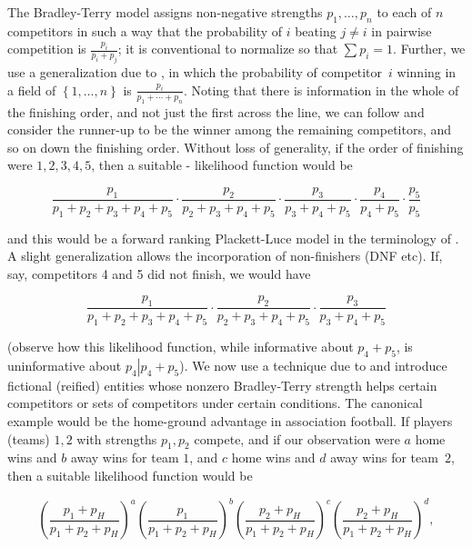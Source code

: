 \documentclass[a4,12pt]{article}
\begin{document}
The Bradley-Terry model \citep{bradley1952} assigns non-negative
strengths $p_1,\ldots, p_n$ to each of $n$ competitors in such a way
that the probability of $i$ beating $j\neq i$ in pairwise competition
is $\frac{p_i}{p_i+p_j}$; it is conventional to normalize so that
$\sum p_i=1$. Further, we use a generalization due to
\citet{luce1959}, in which the probability of competitor~$i$ winning
in a field of $\left\lbrace 1,\ldots, n\right\rbrace$ is
$\frac{p_i}{p_1+\cdots +p_n}$.  Noting that there is information in the
whole of the finishing order, and not just the first across the line,
we can follow \cite{plackett1975} and consider the runner-up to be the
winner among the remaining competitors, and so on down the finishing
order. Without loss of generality, if the order of finishing were
$1,2,3,4,5$, then a suitable
\citeauthor{plackett1975}-\citeauthor{luce1959} likelihood function
would be

\begin{equation}\label{competitors_1_to_5_likelihood}
\frac{p_1}{p_1+p_2+p_3+p_4+p_5}\cdot
\frac{p_2}{p_2+p_3+p_4+p_5}\cdot
\frac{p_3}{p_3+p_4+p_5}\cdot
\frac{p_4}{p_4+p_5}\cdot
\frac{p_5}{p_5}
\end{equation}

and this would be a forward ranking Plackett-Luce model in the
terminology of \cite{mollica2014}. A slight generalization allows the
incorporation of non-finishers (DNF etc). If, say, competitors 4 and 5
did not finish, we would have

\begin{equation}\label{competitors_1_to_3_only_finished}
\frac{p_1}{p_1+p_2+p_3+p_4+p_5}\cdot
\frac{p_2}{p_2+p_3+p_4+p_5}\cdot
\frac{p_3}{p_3+p_4+p_5}
\end{equation}

(observe how this likelihood function, while informative about
$p_4+p_5$, is uninformative about $p_4\left|p_4+p_5\right.$). We now
use a technique due to \cite{hankin2010,hankin2017} and introduce
fictional (reified) entities whose nonzero Bradley-Terry strength
helps certain competitors or sets of competitors under certain
conditions. The canonical example would be the home-ground advantage
in association football.  If players (teams) $1,2$ with strengths
$p_1,p_2$ compete, and if our observation were $a$ home wins and $b$
away wins for team $1$, and $c$ home wins and $d$ away wins for
team~$2$, then a suitable likelihood function would be

\[
\left(\frac{p_1+p_H}{p_1+p_2+p_H}\right)^a
\left(\frac{p_1}{p_1+p_2+p_H}\right)^b
\left(\frac{p_2+p_H}{p_1+p_2+p_H}\right)^c
\left(\frac{p_2+p_H}{p_1+p_2+p_H}\right)^d,
\]
\end{document}
